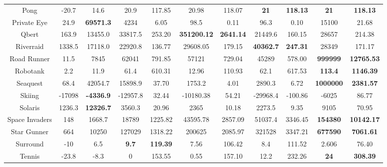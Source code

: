 \documentclass[nohyperref]{article}
\theoremstyle{plain}
\begin{document}
\begin{table}[!hb]
\begin{center}
\begin{tabular}{ |c| c| c| c c| c c| c c| c c|}
 Pong    & -20.7  & 14.6   & 20.9   & 117.85    & 20.98      & 118.07  & \textbf{21}     &  \textbf{118.13}             &\textbf{21}              &\textbf{118.13}    \\
 Private Eye & 24.9&\textbf{69571.3}& 4234 & 6.05     & 98.5       & 0.11    & 96.3   & 0.10                                  &15100           &21.68       \\
 Qbert  & 163.9 & 13455.0 & 33817.5 & 253.20   & \textbf{351200.12}  & \textbf{2641.14} & 21449.6 & 160.15                 &28657           &214.38    \\
 Riverraid & 1338.5 & 17118.0       & 22920.8 & 136.77 & 29608.05  & 179.15  & \textbf{40362.7} & \textbf{247.31}            &28349           &171.17    \\
 Road Runner & 11.5 & 7845          & 62041   & 791.85 & 57121     & 729.04  & 45289   & 578.00                            &\textbf{999999} &\textbf{12765.53} \\
 Robotank   & 2.2   & 11.9          & 61.4   & 610.31    & 12.96     & 110.93  & 62.1    & 617.53                          &\textbf{113.4}           &\textbf{1146.39}  \\
 Seaquest  & 68.4 & 42054.7         & 15898.9 & 37.70    & 1753.2    & 4.01    & 2890.3  & 6.72                     &\textbf{1000000}          &\textbf{2381.57}\\
 Skiing & -17098  & \textbf{-4336.9}& -12957.8 & 32.44  & -10180.38 & 54.21   & -29968.4 & -100.86                             &-6025	          &86.77   \\
 Solaris & 1236.3 & \textbf{12326.7}& 3560.3  & 20.96  & 2365      & 10.18   & 2273.5   & 9.35                                &9105            &70.95   \\
 Space Invaders & 148 & 1668.7      & 18789 & 1225.82 & 43595.78 & 2857.09 & 51037.4 & 3346.45                               &\textbf{154380} &\textbf{10142.17}   \\
 Star Gunner & 664 & 10250          & 127029    & 1318.22 & 200625   & 2085.97 & 321528  & 3347.21                           &\textbf{677590} &\textbf{7061.61}    \\
 Surround    & -10 & 6.5            & \textbf{9.7}       & \textbf{119.39}  & 7.56     & 106.42  & 8.4     & 111.52            &2.606           &76.40    \\
 Tennis  & -23.8   & -8.3           & 0        & 153.55    & 0.55     & 157.10  & 12.2    & 232.26                  &\textbf{24}              &\textbf{308.39}  \\

\end{tabular}
\end{center}
\end{table}
\end{document}
